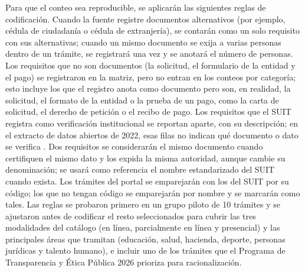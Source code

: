 Para que el conteo sea reproducible, se aplicarán las siguientes reglas de codificación. Cuando la fuente registre documentos alternativos (por ejemplo, cédula de ciudadanía o cédula de extranjería), se contarán como un solo requisito con sus alternativas; cuando un mismo documento se exija a varias personas dentro de un trámite, se registrará una vez y se anotará el número de personas. Los requisitos que no son documentos (la solicitud, el formulario de la entidad y el pago) se registraron en la matriz, pero no entran en los conteos por categoría; esto incluye los que el registro anota como documento pero son, en realidad, la solicitud, el formato de la entidad o la prueba de un pago, como la carta de solicitud, el derecho de petición o el recibo de pago. Los requisitos que el SUIT registra como verificación institucional se reportan aparte, con su descripción; en el extracto de datos abiertos de 2022, esas filas no indican qué documento o dato se verifica . Dos requisitos se considerarán el mismo documento cuando certifiquen el mismo dato y los expida la misma autoridad, aunque cambie su denominación; se usará como referencia el nombre estandarizado del SUIT cuando exista. Los trámites del portal se emparejarán con los del SUIT por su código; los que no tengan código se emparejarán por nombre y se marcarán como tales. Las reglas se probaron primero en un grupo piloto de 10 trámites y se ajustaron antes de codificar el resto seleccionados para cubrir las tres modalidades del catálogo (en línea, parcialmente en línea y presencial) y las principales áreas que tramitan (educación, salud, hacienda, deporte, personas jurídicas y talento humano), e incluir uno de los trámites que el Programa de Transparencia y Ética Pública 2026 prioriza para racionalización.

